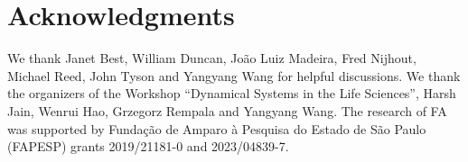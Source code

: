 \documentclass[a4paper,fleqn]{cas-dc}
\begin{document}







\section*{Acknowledgments}
We thank Janet Best, William Duncan, Jo\~ao Lu\-iz Ma\-dei\-ra, Fred Nijhout, Michael Reed, John Tyson and Yangyang Wang for helpful discussions.
We thank the organizers of the Workshop ``Dynamical Systems in the Life Sciences'', Harsh Jain,
Wenrui Hao, Grzegorz Rempala and Yangyang Wang.
The research of FA was supported by Funda\c{c}\~ao de Amparo \`a Pes\-qui\-sa do Estado de S\~ao Paulo (FAPESP) grants 2019/21181-0 and 2023/04839-7.


\end{document}
